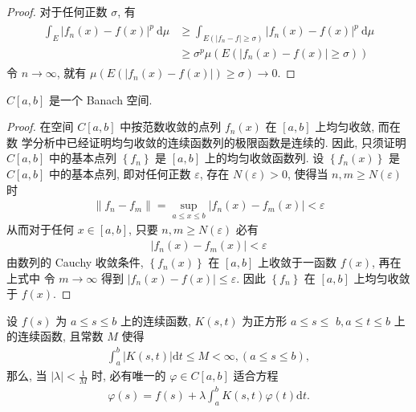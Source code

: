 \begin{proof}
 对于任何正数 $\sigma$, 有
\begin{align*}
\begin{aligned}
\int_E\left|f_n(x)-f(x)\right|^p \mathrm{~d} \mu & \geqslant \int_{E\left(\left|f_n-f\right| \geqslant \sigma\right)}\left|f_n(x)-f(x)\right|^p \mathrm{~d} \mu \\
& \geqslant \sigma^p \mu\left(E\left(\left|f_n(x)-f(x)\right| \geqslant \sigma\right)\right)
\end{aligned}
\end{align*}
令 $n \rightarrow \infty$, 就有 $\mu\left(E\left(\left|f_n(x)-f(x)\right|\right) \geqslant \sigma\right) \rightarrow 0$.
\end{proof}


\begin{example}
    $ C[a, b]$ 是一个 Banach 空间.
\end{example}

\begin{proof}
    在空间 $C[a, b]$ 中按范数收敛的点列 $f_n(x)$ 在 $[a, b]$ 上均匀收敛, 而在数 学分析中已经证明均匀收敛的连续函数列的极限函数是连续的. 因此, 只须证明 $C[a, b]$ 中的基本点列 $\left\{f_n\right\}$ 是 $[a, b]$ 上的均匀收敛函数列. 设 $\left\{f_n(x)\right\}$ 是 $C[a, b]$ 中的基本点列, 即对任何正数 $\varepsilon$, 存在 $N(\varepsilon)>0$, 使得当 $n, m \geqslant N(\varepsilon)$ 时
\begin{align*}
\left\|f_n-f_m\right\|=\sup _{a \leqslant x \leqslant b}\left|f_n(x)-f_m(x)\right|<\varepsilon
\end{align*}
从而对于任何 $x \in[a, b]$, 只要 $n, m \geqslant N(\varepsilon)$ 必有
\begin{align*}
\left|f_n(x)-f_m(x)\right|<\varepsilon
\end{align*}
由数列的 Cauchy 收敛条件, $\left\{f_n(x)\right\}$ 在 $[a, b]$ 上收敛于一函数 $f(x)$, 再在上式中 令 $m \rightarrow \infty$ 得到 $\left|f_n(x)-f(x)\right| \leqslant \varepsilon$. 因此 $\left\{f_n\right\}$ 在 $[a, b]$ 上均匀收敛于 $f(x)$.
\end{proof}

\begin{example}
设 $f(s)$ 为 $a \leqslant s \leqslant b$ 上的连续函数, $K(s, t)$ 为正方形 $a \leqslant s \leqslant$ $b, a \leqslant t \leqslant b$ 上的连续函数, 且常数 $M$ 使得
\begin{align*}
\int_a^b|K(s, t)| \mathrm{d} t \leqslant M<\infty,(a \leqslant s \leqslant b),
\end{align*}
那么, 当 $|\lambda|<\frac{1}{M}$ 时, 必有唯一的 $\varphi \in C[a, b]$ 适合方程
\begin{align*}
\varphi(s)=f(s)+\lambda \int_a^b K(s, t) \varphi(t) \mathrm{d} t .
\end{align*}

\end{example}

